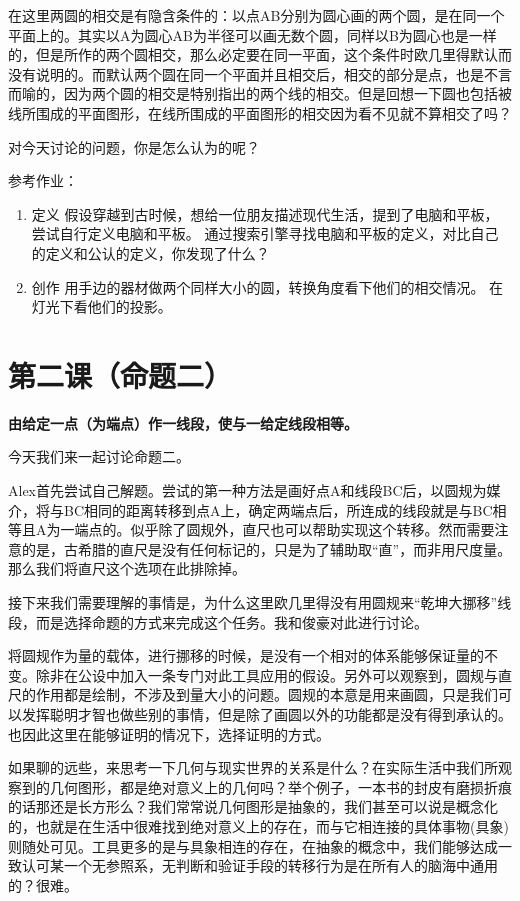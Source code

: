 \documentclass[
]{book}
\providecommand{\tightlist}{%
  \setlength{\itemsep}{0pt}\setlength{\parskip}{0pt}}
\begin{document}
在这里两圆的相交是有隐含条件的：以点AB分别为圆心画的两个圆，是在同一个平面上的。其实以A为圆心AB为半径可以画无数个圆，同样以B为圆心也是一样的，但是所作的两个圆相交，那么必定要在同一平面，这个条件时欧几里得默认而没有说明的。而默认两个圆在同一个平面并且相交后，相交的部分是点，也是不言而喻的，因为两个圆的相交是特别指出的两个线的相交。但是回想一下圆也包括被线所围成的平面图形，在线所围成的平面图形的相交因为看不见就不算相交了吗？

对今天讨论的问题，你是怎么认为的呢？

参考作业：

\begin{enumerate}
\def\labelenumi{\arabic{enumi}.}
\tightlist
\item
  定义
  假设穿越到古时候，想给一位朋友描述现代生活，提到了电脑和平板，尝试自行定义电脑和平板。
  通过搜索引擎寻找电脑和平板的定义，对比自己的定义和公认的定义，你发现了什么？
\item
  创作
  用手边的器材做两个同样大小的圆，转换角度看下他们的相交情况。
  在灯光下看他们的投影。
\end{enumerate}

\hypertarget{ux7b2cux4e8cux8bfeux547dux9898ux4e8c}{%
\chapter{第二课（命题二）}\label{ux7b2cux4e8cux8bfeux547dux9898ux4e8c}}

\textbf{由给定一点（为端点）作一线段，使与一给定线段相等。}

今天我们来一起讨论命题二。

Alex首先尝试自己解题。尝试的第一种方法是画好点A和线段BC后，以圆规为媒介，将与BC相同的距离转移到点A上，确定两端点后，所连成的线段就是与BC相等且A为一端点的。似乎除了圆规外，直尺也可以帮助实现这个转移。然而需要注意的是，古希腊的直尺是没有任何标记的，只是为了辅助取``直''，而非用尺度量。那么我们将直尺这个选项在此排除掉。

接下来我们需要理解的事情是，为什么这里欧几里得没有用圆规来``乾坤大挪移''线段，而是选择命题的方式来完成这个任务。我和俊豪对此进行讨论。

将圆规作为量的载体，进行挪移的时候，是没有一个相对的体系能够保证量的不变。除非在公设中加入一条专门对此工具应用的假设。另外可以观察到，圆规与直尺的作用都是绘制，不涉及到量大小的问题。圆规的本意是用来画圆，只是我们可以发挥聪明才智也做些别的事情，但是除了画圆以外的功能都是没有得到承认的。也因此这里在能够证明的情况下，选择证明的方式。

如果聊的远些，来思考一下几何与现实世界的关系是什么？在实际生活中我们所观察到的几何图形，都是绝对意义上的几何吗？举个例子，一本书的封皮有磨损折痕的话那还是长方形么？我们常常说几何图形是抽象的，我们甚至可以说是概念化的，也就是在生活中很难找到绝对意义上的存在，而与它相连接的具体事物(具象)则随处可见。工具更多的是与具象相连的存在，在抽象的概念中，我们能够达成一致认可某一个无参照系，无判断和验证手段的转移行为是在所有人的脑海中通用的？很难。
\end{document}
